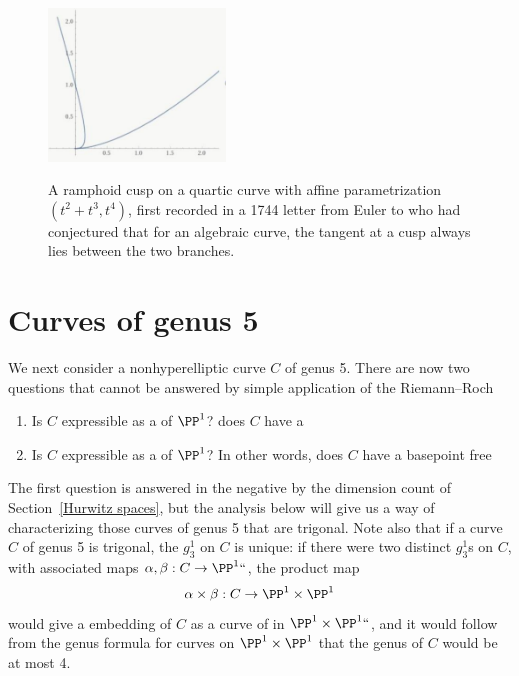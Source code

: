 \begin{figure}
\inprogress
\includegraphics[height=1.6in]{"main/ramphoid"}
\caption{A ramphoid cusp on a quartic curve with affine parametrization
$(t^2{+}t^3,t^4)$, first recorded in a 1744 letter from Euler to
who had conjectured that for an algebraic curve, the
tangent at a cusp always lies between the two branches.}
%
\label{ramphoid}
\end{figure}

\section{Curves of genus 5}

We next consider a nonhyperelliptic curve $C$ of genus 5. There are
now two questions that cannot be answered by simple application of the
Riemann--Roch

\begin{enumerate}
\item Is $C$ expressible as a
of $\PP^1$?
does $C$ have a
\item Is $C$ expressible as a
of $\PP^1$?
In other words, does $C$ have a basepoint free
\end{enumerate}

The first question is answered in the negative by the dimension count
of Section~\ref{Hurwitz spaces}, but the analysis below will give us a
way of characterizing those curves of genus 5 that are trigonal. Note
also that if a curve $C$ of genus 5 is trigonal, the $g^1_3$ on $C$ is
unique: if there were two distinct $g^1_3$s on $C$, with associated
maps $\alpha, \beta : C \to \PP^1` `$, the product map
$$
\alpha \times \beta : C \to \PP^1 \times \PP^1
$$
would give a
%
embedding of $C$ as a curve of
%
in $\PP^1 \times \PP^1` `$, and it would follow from the genus formula
for curves on $\PP^1 \times \PP^1$ that the genus of $C$ would be at most 4.

